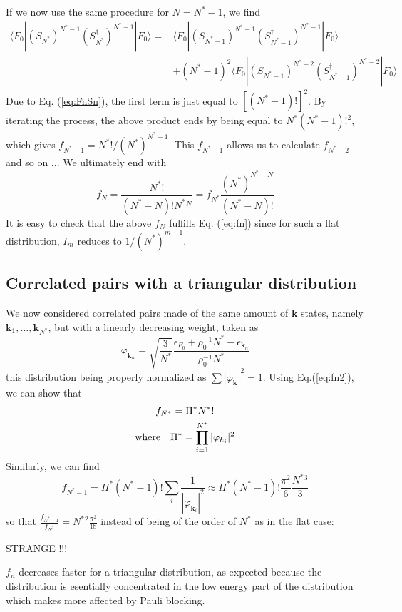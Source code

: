 \documentclass[aps,prb,preprint,groupedaddress,amsmath]{revtex4-1}
\newcommand{\vk}{\ensuremath{\mathbf{k}}}
\newcommand{\dg}{\ensuremath{\dagger}}
\begin{document}
 If we now use the same procedure for $N=N^*-1$, we find 
 \begin{equation}
 \begin{split}
\langle{F_0}|(S_{N^*}^{})^{N^*-1}(S_{N^*}^\dg)^{N^*-1}|F_0\rangle
=&\langle{F_0}|(S_{N^*-1}^{})^{N^*-1}(S_{N^*-1}^\dg)^{N^*-1}|F_0\rangle\\
&+(N^*-1)^2\langle{F_0}|(S_{N^*-1}^{})^{N^*-2}(S_{N^*-1}^\dg)^{N^*-2}|F_0\rangle
\end{split}
\end{equation} 
Due to Eq. (\ref{eq:FnSn}), the first term is just equal to $[(N^*-1)!]^2$. By iterating the process, the above product ends by being equal to $N^*(N^*-1)!^2$, which gives $f_{N^*-1}=N^*!/(N^*)^{N^*-1}$.  This $f_{N^*-1}$ allows us to calculate $f_{N^*-2}$ and so on ...  We ultimately end with
\begin{equation}
f_N=\frac{N^*!}{(N^*-N)!N^*{}^N}=f_{N^*}\frac{(N^*)^{N^*-N}}{(N^*-N)!}
\end{equation}
It is easy to check that  the above $f_N$ fulfills Eq. (\ref{eq:fn}) since for such a flat distribution, $I_m$ reduces to $1/(N^*)^{m-1}$.
\subsection{Correlated pairs with a triangular distribution}
We now considered correlated pairs made of the same amount of $\vk$ states, namely $\vk_1,\dots,\vk_{N^*}$, but with a linearly decreasing weight, taken as 
\begin{equation}
 \varphi_{\vk_n}=\sqrt{\frac{3}{N^*}}\frac{\epsilon_{F_0}+\rho_0^{-1}N^*-\epsilon_{\vk_n}}{\rho_0^{-1}N^*}
\end{equation}
this distribution being properly normalized as $\sum|\varphi_\vk|^2=1$.  Using Eq.(\ref{eq:fn2}), we can show that 
\begin{gather}
f_{N^*}=\Pi^*N^*!\\
\mbox{where}\quad \Pi^*=\prod_{i=1}^{N^*}|\varphi_{k_i} |^2\notag
\end{gather}
Similarly, we can find
\begin{equation}
 f_{N^*-1}=\Pi^*(N^*-1)!\sum_{i}\frac{1}{|\varphi_{\vk_i}|^2}\approx\Pi^*(N^*-1)!\frac{\pi^2}{6}\frac{N^*{}^3}{3}
\end{equation}
so that $\frac{f_{N^*-1}}{f_{N^*}}=N^*{}^2\frac{\pi^2}{18}$ instead of being of the order of $N^*$ as in the flat case: 

STRANGE !!!

 $f_n$ decreases faster for a triangular distribution, as expected because the distribution is esentially concentrated in the low energy part of the distribution which makes more affected by Pauli blocking.   
\end{document}
